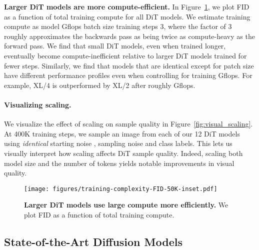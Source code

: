 \documentclass[10pt,twocolumn,letterpaper]{article}
\begin{document}
\textbf{Larger DiT models are more compute-efficient.} In Figure~\ref{fig:training_complexity_fid}, we plot FID as a function of total training compute for all DiT models. We estimate training compute as model Gflops  batch size  training steps  3, where the factor of 3 roughly approximates the backwards pass as being twice as compute-heavy as the forward pass. We find that small DiT models, even when trained longer, eventually become compute-inefficient relative to larger DiT models trained for fewer steps. Similarly, we find that models that are identical except for patch size have different performance profiles even when controlling for training Gflops. For example, XL/4 is outperformed by XL/2 after roughly  Gflops.

\vspace{-2mm}
\paragraph{Visualizing scaling.} We visualize the effect of scaling on sample quality in Figure~\ref{fig:visual_scaling}. At 400K training steps, we sample an image from each of our 12 DiT models using \textit{identical} starting noise , sampling noise and class labels. This lets us visually interpret how scaling affects DiT sample quality. Indeed, scaling both model size and the number of tokens yields notable improvements in visual quality. 
\begin{figure}\centering
\texttt{[image: figures/training-complexity-FID-50K-inset.pdf]}
\vspace{-6.25mm}
\caption{\textbf{Larger DiT models use large compute more efficiently.} We plot FID as a function of total training compute.}
\label{fig:training_complexity_fid}
\end{figure}
\vspace{2mm}
\subsection{State-of-the-Art Diffusion Models}
\end{document}
